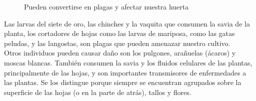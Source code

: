 \documentclass[../main.tex]{subfiles}
\begin{document}
\begin{figure}[H]
    \centering
    \caption*{\color{CompostGreen!50!black}Pueden convertirse en plagas y afectar nuestra huerta}
    \label{insectos4}
\end{figure}

Las larvas del siete de oro, las chinches y la vaquita que consumen la savia de la planta, los cortadores de hojas como las larvas de mariposa, como las gatas peludas, y las langostas, son plagas que pueden amenazar nuestro cultivo.\\

Otros individuos pueden causar daño son los pulgones, arañuelas (ácaros) y moscas blancas. También consumen la savia y los fluidos celulares de las plantas, principalmente de las hojas, y son importantes transmisores de enfermedades a las plantas. Se los distingue porque siempre se encuentran agrupados sobre la superficie de las hojas (o en la parte de atrás), tallos y flores.

\vfill

\pagebreak
\end{document}
